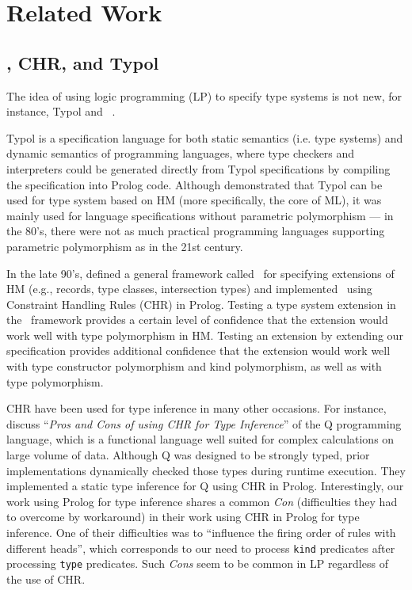 \section{Related Work}\label{sec:relwork}
\subsection{\HMX, CHR, and Typol}
The idea of using logic programming (LP) to specify type systems is not new,
for instance, Typol \cite{Despeyroux84} and \HMX\ \cite{HMX99}.

Typol is a specification language for both static semantics (i.e. type systems)
and dynamic semantics of programming languages, where type checkers and
interpreters could be generated directly from Typol specifications
by compiling the specification into Prolog code. Although \citet{Despeyroux84}
demonstrated that Typol can be used for type system based on HM (more
specifically, the core of ML), it was mainly used for language specifications
without parametric polymorphism --- in the 80's, there were not as much
practical programming languages supporting parametric polymorphism as
in the 21st century.

In the late 90's, \citet*{HMX99} defined a general framework called \HMX\ for
specifying extensions of HM (e.g., records, type classes, intersection types)
and \citet{tyinferCHR02} implemented \HMX\ using Constraint Handling Rules (CHR)
in Prolog. Testing a type system extension in the \HMX\ framework provides
a certain level of confidence that the extension would work well with
type polymorphism in HM. Testing an extension by extending our specification
provides additional confidence that the extension would work well with
type constructor polymorphism and kind polymorphism, as well as
with type polymorphism.

CHR have been used for type inference in many other occasions. For instance,
\citet{CsorbaCHRforTyInf12} discuss ``\emph{Pros and Cons of using CHR for
Type Inference}'' of the Q programming language, which is a functional
language well suited for complex calculations on large volume of data.
Although Q was designed to be strongly typed, prior implementations dynamically
checked those types during runtime execution. They implemented a static type
inference for Q using CHR in Prolog. Interestingly, our work using Prolog for
type inference shares a common \emph{Con} (difficulties they had to overcome
by workaround) in their work using CHR in Prolog for type inference.
One of their difficulties was to ``influence the firing order of rules
with different heads'', which corresponds to our need to process \texttt{kind}
predicates after processing \texttt{type} predicates. Such \emph{Cons} seem
to be common in LP regardless of the use of CHR.

